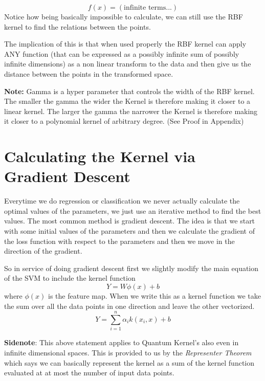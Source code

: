\documentclass[hidelinks]{book}
\numberwithin{equation}{section}
\begin{document}
  $$ f(x) = (\text{infinite terms...}) $$ Notice how being basically
  impossible to calculate, we can still use the RBF kernel to find the
  relations between the points.

  The implication of this is that when used properly the RBF kernel can
  apply ANY function (that can be expressed as a possibly infinite sum of possibly infinite dimensions)
  as a non linear transform to the data and then give us the distance between
  the points in the transformed space.

  \textbf{Note:} Gamma is a hyper parameter that controls the width of the RBF kernel.
  The smaller the gamma the wider the Kernel is therefore making it closer to a
  linear kernel. The larger the gamma the narrower the Kernel is therefore making
  it closer to a polynomial kernel of arbitrary degree. (See Proof in Appendix)

\section{Calculating the Kernel via Gradient Descent}

  Everytime we do regression or classification we never actually calculate the
  optimal values of the parameters, we just use an iterative method to find
  the best values. The most common method is gradient descent. The idea is
  that we start with some initial values of the parameters and then we
  calculate the gradient of the loss function with respect to the parameters
  and then we move in the direction of the gradient.

  So in service of doing gradient descent first we slightly modify the
  main equation of the SVM to include the kernel function
  $$ Y = W\phi(x) +b $$ where $\phi(x)$ is the feature map. When we write this
  as a kernel function we take the sum over all the data points in one direction
  and leave the other vectorized.
  $$ Y = \sum_{i=1}^n \alpha_i k(x_i, x) + b $$

  \textbf{Sidenote}: This above statement applies to Quantum Kernel's also even
  in infinite dimensional spaces. This is provided to us by the \textit{Representer Theorem}
  which says we can basically represent the kernel as a sum of the kernel
  function evaluated at at most the number of input data points.\\
\end{document}
